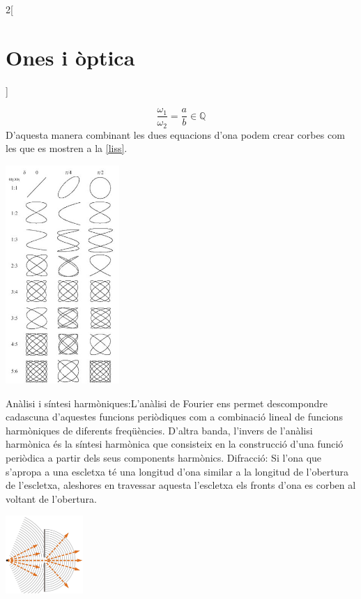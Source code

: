 \documentclass[../../../main.tex]{subfiles}
\begin{document}
\begin{multicols}{2}[\section{Ones i òptica}]
\begin{itemize}
\begin{itemize}
                  $$\frac{\omega_1}{\omega_2}=\frac{a}{b}\in\mathbb{Q}$$ D'aquesta manera combinant les dues equacions d'ona podem crear corbes com les que es mostren a la \cref{liss}.
          \end{itemize}
          \begin{minipage}{\linewidth}
            \centering
            \includegraphics[width=4.3cm]{Physics/1st/Waves_and_optics/Images/liss.jpg}
            \label{liss}
          \end{minipage}
  \end{itemize}
  Anàlisi i síntesi harmòniques:\newline L'anàlisi de Fourier ens permet descompondre cadascuna d'aquestes funcions pe\-riò\-di\-ques com a combinació lineal de funcions harmòniques de diferents freqüències. D'altra banda, l'invers de l'anàlisi harmònica és la síntesi harmònica que consisteix en la construcció d'una funció periòdica a partir dels seus components harmònics.\newline
  Difracció: Si l'ona que s'apropa a una es\-clet\-xa té una longitud d'ona similar a la longitud de l'obertura de l'escletxa, aleshores en tra\-ves\-sar aquesta l'escletxa els fronts d'ona es corben al voltant de l'obertura.\newline
  \begin{minipage}{\linewidth}
    \centering
    \includegraphics[width=2.95cm]{Physics/1st/Waves_and_optics/Images/diff.jpg}

\end{minipage}
\end{multicols}
\end{document}
